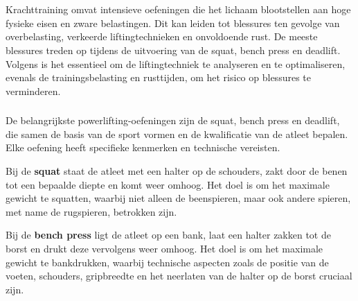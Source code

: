 \chapter{}%
\label{ch:stand-van-zaken}


\section{}%
\label{sec:krachttraining}

Krachttraining omvat intensieve oefeningen die het lichaam blootstellen aan hoge fysieke eisen en zware belastingen. 
Dit kan leiden tot blessures ten gevolge van overbelasting, verkeerde liftingtechnieken en onvoldoende rust.
De meeste blessures treden op tijdens de uitvoering van de squat, bench press en deadlift.  
Volgens \textcite{BengtssonEtAl2018} is het essentieel om de liftingtechniek te analyseren en te optimaliseren, evenals de trainingsbelasting en rusttijden, om het risico op blessures te verminderen.

\medskip

\subsection{}%
\label{subsec:oefeningen}

De belangrijkste powerlifting-oefeningen zijn de squat, bench press en deadlift, die samen de basis van de sport vormen en de kwalificatie van de atleet bepalen. 
Elke oefening heeft specifieke kenmerken en technische vereisten. 

\medskip

Bij de \textbf{squat} staat de atleet met een halter op de schouders, zakt door de benen tot een bepaalde diepte en komt weer omhoog. 
Het doel is om het maximale gewicht te squatten, waarbij niet alleen de beenspieren, maar ook andere spieren, met name de rugspieren, betrokken zijn. 

\medskip

Bij de \textbf{bench press} ligt de atleet op een bank, laat een halter zakken tot de borst en drukt deze vervolgens weer omhoog.
Het doel is om het maximale gewicht te bankdrukken, waarbij technische aspecten zoals de positie van de voeten, schouders, gripbreedte en het neerlaten van de halter op de borst cruciaal zijn.


